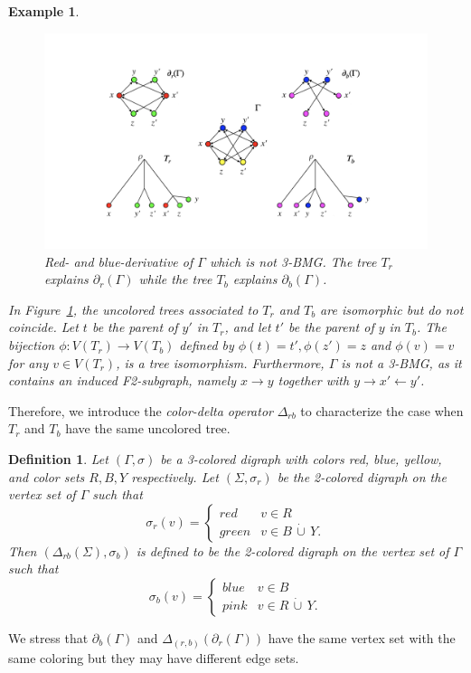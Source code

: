 \documentclass[final,3p,times]{elsarticle}
\newtheorem{definition}{Definition}[section]
\newtheorem{example}{Example}[section]
\begin{document}
\begin{example}
\label{ex:2BMGcolor-derivative_no3BMG}
\begin{figure}[ht]
  \centering
    \includegraphics[width=16cm]{figures/different_trees.png}
    \caption{Red- and blue-derivative of $\Gamma$ which is not 3-BMG. The tree $T_r$ explains $\partial_r(\Gamma)$ while the tree $T_b$ explains $\partial_b(\Gamma)$.}
    \label{fig:different_trees}
\end{figure}

In Figure~\ref{fig:different_trees}, the uncolored trees associated to $T_r$ and $T_b$ are isomorphic but  do not coincide. Let $t$ be the parent of $y'$ in $T_r$, and let $t'$ be the parent of $y$ in $T_b$. The bijection $\phi:V(T_r)\rightarrow V(T_b)$ defined by $\phi(t)=t',\phi(z')=z$ and $\phi(v)=v$ for any $v\in V(T_r)$, is a tree isomorphism.  
Furthermore, $\Gamma$ is not a 3-BMG, as it contains an induced F2-subgraph, namely $x\rightarrow y$ together with $y\rightarrow x'\leftarrow y'$. 
\end{example}

Therefore, we introduce the \emph{color-delta operator} $\Delta_{rb}$ to characterize the case when $T_r$ and $T_b$ have the same uncolored tree.

\begin{definition}
\label{def:delta_operator}
Let $(\Gamma,\sigma)$ be a 3-colored digraph with colors red, blue, yellow, and color sets $R,B,Y$ respectively.
Let $(\Sigma,\sigma_r)$ be the 2-colored digraph on the vertex set of $\Gamma$ such that
\begin{equation}\label{def:sigma-r}
\sigma_r(v)= \begin{cases} 
      red & v\in R \\
     green & v\in B \,\dot{\cup}\, Y.
   \end{cases}
\end{equation}
Then
$(\Delta_{rb}(\Sigma),\sigma_b)$ is defined to be the 2-colored digraph on the vertex set of $\Gamma$ such that
\begin{equation}\label{def:sigma-b}
\sigma_b(v)= \begin{cases} 
    blue & v\in B \\
     pink & v\in R \,\dot{\cup}\, Y.
   \end{cases}
\end{equation}
 \end{definition}
We stress that $\partial_b(\Gamma)$ and $\Delta_{(r,b)}(\partial_r(\Gamma))$ have the same vertex set with the same coloring but they may have different edge sets. 
\end{document}
